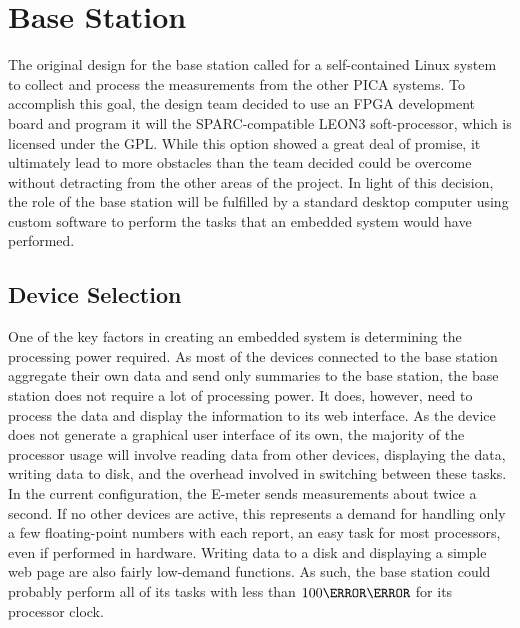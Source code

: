 \section{Base Station}
The original design for the base station called for a self-contained Linux
system to collect and process the measurements from the other PICA
systems. To accomplish this goal, the design team decided to use an
\ac{FPGA} development board and program it will the SPARC-compatible LEON3
soft-processor, which is licensed under the \ac{GPL}. While this option
showed a great deal of promise, it ultimately lead to more obstacles than
the team decided could be overcome without detracting from the other areas
of the project. In light of this decision, the role of the base station
will be fulfilled by a standard desktop computer using custom software to
perform the tasks that an embedded system would have performed.



\subsection{Device Selection}
One of the key factors in creating an embedded system is determining the
processing power required. As most of the devices connected to the base
station aggregate their own data and send only summaries to the base
station, the base station does not require a lot of processing power. It
does, however, need to process the data and display the information to its
web interface. As the device does not generate a graphical user interface of
its own, the majority of the processor usage will involve reading data from
other devices, displaying the data, writing data to disk, and the overhead
involved in switching between these tasks. In the current configuration,
the E-meter sends measurements about twice a second. If no other devices
are active, this represents a demand for handling only a few floating-point
numbers with each report, an easy task for most processors, even if
performed in hardware. Writing data to a disk and displaying a simple web
page are also fairly low-demand functions. As such, the base station could
probably perform all of its tasks with less than $100\mega\hertz$ for its
processor clock.


